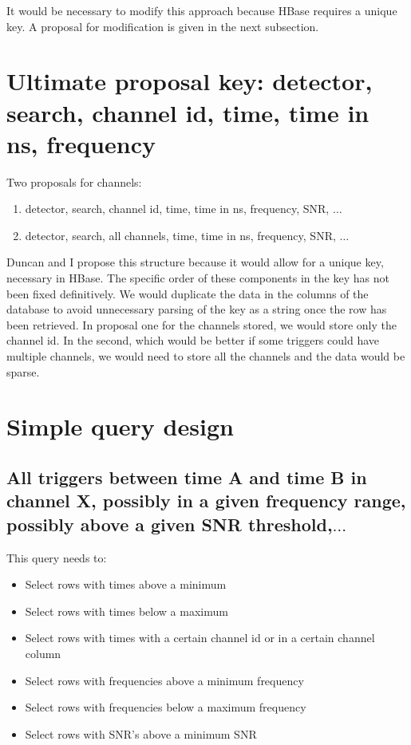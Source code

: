 \documentclass{article}
\begin{document}
It would be necessary to modify this approach because HBase requires a
unique key. A proposal for modification is given in the next
subsection.

\section{Ultimate proposal key: detector, search, channel id, time, time in ns, frequency}

Two proposals for channels:
\begin{enumerate}
\item detector, search, channel id, time, time in ns, frequency, SNR, $\ldots$
\item detector, search, all channels, time, time in ns, frequency, SNR, $\ldots$
\end{enumerate}
  
Duncan and I propose this structure because it would allow for a
unique key, necessary in HBase. The specific order of these components
in the key has not been fixed definitively. We would duplicate the
data in the columns of the database to avoid unnecessary parsing of
the key as a string once the row has been retrieved. In proposal one
for the channels stored, we would store only the channel id. In the
second, which would be better if some triggers could have multiple
channels, we would need to store all the channels and the data would
be sparse.


\section{Simple query design}
\label{queries}

\subsection{All triggers between time A and time B in channel X, possibly in a given frequency range, possibly above a given SNR threshold,$\ldots$}
\label{query1}

This query needs to:
\begin{itemize}
\item Select rows with times above a minimum
\item Select rows with times below a maximum
\item Select rows with times with a certain channel id or in a certain channel column
\item Select rows with frequencies above a minimum frequency
\item Select rows with frequencies below a maximum frequency
\item Select rows with SNR's above a minimum SNR
\end{itemize}
\end{document}
